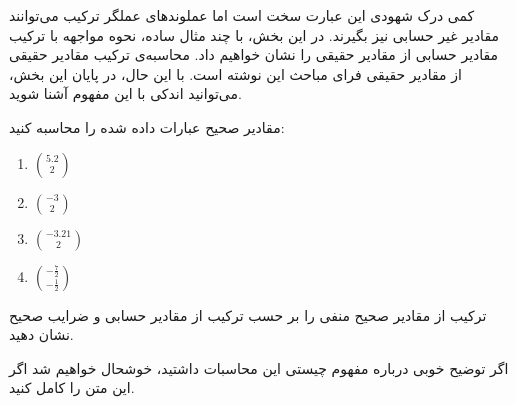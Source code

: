 
کمی درک شهودی این عبارت سخت است اما عملوند‌های عملگر ترکیب می‌توانند مقادیر غیر حسابی نیز بگیرند.
در این بخش، با چند مثال ساده، نحوه مواجهه با ترکیب مقادیر حسابی از مقادیر حقیقی را نشان خواهیم داد.
محاسبه‌ی ترکیب مقادیر حقیقی از مقادیر حقیقی فرای مباحث این نوشته است.
با این حال، در پایان این بخش، می‌توانید اندکی با این مفهوم آشنا شوید.

\begin{problem}
    مقادیر صحیح عبارات داده شده را محاسبه کنید:

    \begin{enumerate}
        \item 
        $5.2 \choose 2$


        \item 
        $-3 \choose 2$


        \item 
        $-3.21 \choose 2$


        \item 
        $-\frac{7}{2} \choose -\frac{1}{2}$

    \end{enumerate}
\end{problem}

\begin{problem}
    ترکیب از مقادیر صحیح منفی را بر حسب ترکیب از مقادیر حسابی و ضرایب صحیح نشان دهید.
    
\end{problem}

اگر توضیح خوبی درباره مفهوم چیستی این محاسبات داشتید، خوشحال خواهیم شد اگر این متن را کامل کنید.